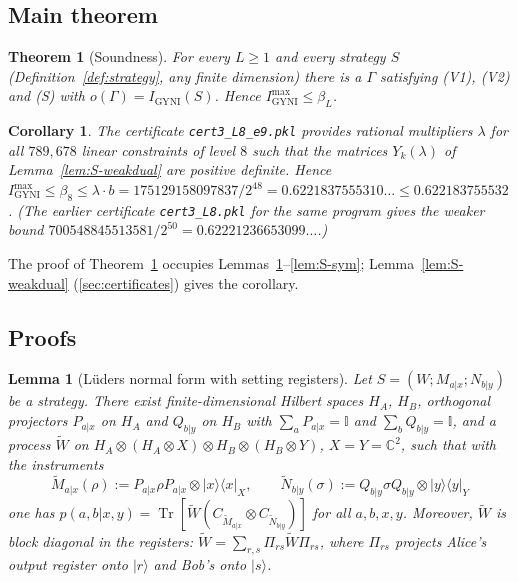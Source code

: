 \documentclass[aps,pra,onecolumn,notitlepage,superscriptaddress,longbibliography,nofootinbib,11pt]{revtex4-2}
\newtheorem{theorem}{Theorem}
\newtheorem{lemma}{Lemma}
\newtheorem{corollary}{Corollary}
\theoremstyle{remark}
\newcommand{\Tr}{\operatorname{Tr}}
\newcommand{\ket}[1]{\lvert #1\rangle}
\newcommand{\bra}[1]{\langle #1\rvert}
\newcommand{\one}{\mathbb{I}}
\newcommand{\CC}{\mathbb{C}}
\newcommand{\Igy}{I_{\mathrm{GYNI}}}
\newcommand{\Imax}{I_{\mathrm{GYNI}}^{\max}}
\newcommand{\file}[1]{\texttt{#1}}
\begin{document}
\subsection{Main theorem}

\begin{theorem}[Soundness]\label{thm:S-sound}
For every $L\ge1$ and every strategy $S$ (Definition~\ref{def:strategy}, any finite dimension) there is a $\Gamma$ satisfying (V1), (V2) and (S) with $o(\Gamma)=\Igy(S)$. Hence $\Imax\le\beta_L$.
\end{theorem}

\begin{corollary}\label{cor:S-L8}
The certificate \file{cert3\_L8\_e9.pkl} provides rational multipliers $\lambda$ for all $789{,}678$ linear constraints of level $8$ such that the matrices $Y_k(\lambda)$ of Lemma~\ref{lem:S-weakdual} are positive definite. Hence $\Imax\le\beta_8\le\lambda\cdot b=175129158097837/2^{48}=0.6221837555310\ldots\le0.622183755532$. (The earlier certificate \file{cert3\_L8.pkl} for the same program gives the weaker bound $700548845513581/2^{50}=0.62221236653099\ldots$.)
\end{corollary}

The proof of Theorem~\ref{thm:S-sound} occupies Lemmas~\ref{lem:S-lueders}--\ref{lem:S-sym}; Lemma~\ref{lem:S-weakdual} (\ref{sec:certificates}) gives the corollary.

\subsection{Proofs}

\begin{lemma}[L\"uders normal form with setting registers]\label{lem:S-lueders}
Let $S=(W;M_{a|x};N_{b|y})$ be a strategy. There exist finite-dimensional Hilbert spaces $H_A$, $H_B$, orthogonal projectors $P_{a|x}$ on $H_A$ and $Q_{b|y}$ on $H_B$ with $\sum_aP_{a|x}=\one$ and $\sum_bQ_{b|y}=\one$, and a process $\widetilde W$ on $H_A\otimes(H_A\otimes X)\otimes H_B\otimes(H_B\otimes Y)$, $X=Y=\CC^2$, such that with the instruments
\begin{equation}
\widetilde M_{a|x}(\rho):=P_{a|x}\rho P_{a|x}\otimes\ket{x}\bra{x}_X,\qquad
\widetilde N_{b|y}(\sigma):=Q_{b|y}\sigma Q_{b|y}\otimes\ket{y}\bra{y}_Y
\end{equation}
one has $p(a,b|x,y)=\Tr[\widetilde W(C_{\widetilde M_{a|x}}\otimes C_{\widetilde N_{b|y}})]$ for all $a,b,x,y$. Moreover, $\widetilde W$ is block diagonal in the registers: $\widetilde W=\sum_{r,s}\Pi_{rs}\widetilde W\Pi_{rs}$, where $\Pi_{rs}$ projects Alice's output register onto $\ket{r}$ and Bob's onto $\ket{s}$.
\end{lemma}
\end{document}
